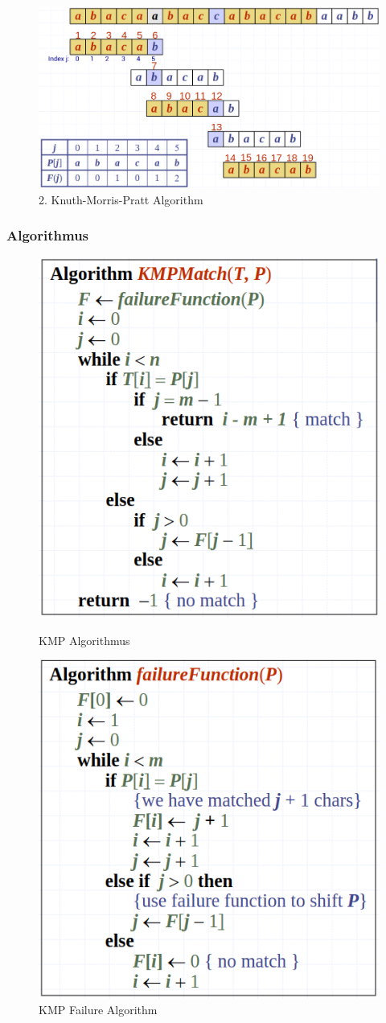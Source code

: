 \begin{figure}[h]
\centering
\includegraphics[width=0.8\linewidth]{images/kmpbeispiel}
\caption{2. Knuth-Morris-Pratt Algorithm}
\label{fig:kmpmatchalgorithm}
\end{figure}

\clearpage

\subsubsection{Algorithmus}
\begin{figure}[h!]
	\begin{minipage}[t]{1\textwidth}
		\centering
		\includegraphics[width=0.5\linewidth]{images/kmpmatch}
		\caption{KMP Algorithmus}
		\label{fig:kmpalg}
	\end{minipage}
	\begin{minipage}[t]{1\textwidth}
		\centering
		\includegraphics[width=0.5\linewidth]{images/kmpfailure}
		\caption{KMP Failure Algorithm}
		\label{fig:kmpfailure}
	\end{minipage}
\end{figure}


